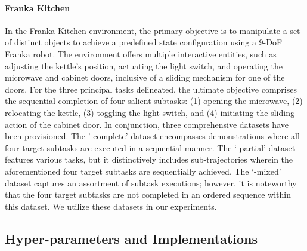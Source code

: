 \paragraph{Franka Kitchen} In the Franka Kitchen environment, the primary objective is to manipulate a set of distinct objects to achieve a predefined state configuration using a 9-DoF Franka robot. The environment offers multiple interactive entities, such as adjusting the kettle's position, actuating the light switch, and operating the microwave and cabinet doors, inclusive of a sliding mechanism for one of the doors. For the three principal tasks delineated, the ultimate objective comprises the sequential completion of four salient subtasks: (1) opening the microwave, (2) relocating the kettle, (3) toggling the light switch, and (4) initiating the sliding action of the cabinet door. In conjunction, three comprehensive datasets have been provisioned. The '-complete' dataset encompasses demonstrations where all four target subtasks are executed in a sequential manner. The ‘-partial’ dataset features various tasks, but it distinctively includes sub-trajectories wherein the aforementioned four target subtasks are sequentially achieved. The ‘-mixed’ dataset captures an assortment of subtask executions; however, it is noteworthy that the four target subtasks are not completed in an ordered sequence within this dataset.  We utilize these datasets in our experiments.



\subsection{Hyper-parameters and Implementations}




